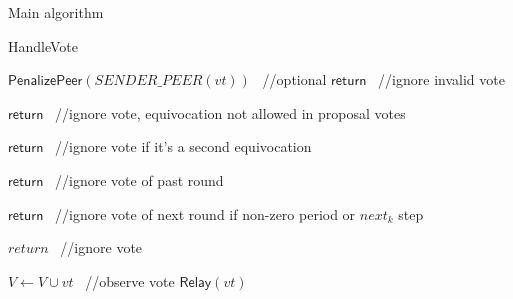 \documentclass[10pt,a4paper]{article}
\begin{document}
\begin{section}{Main algorithm}
\begin{subsection}{HandleVote}
\begin{algorithm}[H]
\begin{algorithmic}[1]
            


                \State $\mathsf{PenalizePeer}(SENDER\_PEER(vt))$ \ //optional
                \State $\mathsf{return}$ \ //ignore invalid vote
            \EndIf

                \State $\mathsf{return}$ \ //ignore vote, equivocation not allowed in proposal votes
            \EndIf

                \State $\mathsf{return}$ \ //ignore vote if it's a second equivocation
            \EndIf

                \State $\mathsf{return}$ \ //ignore vote of past round
            \EndIf

                \State $\mathsf{return}$ \ //ignore vote of next round if non-zero period or $next_k$ step
            \EndIf

                \State $return$ \ //ignore vote
            \EndIf

            \State $V \gets V \cup vt$ \ //observe vote
            \State $\mathsf{Relay}(vt)$


\end{algorithmic}
\end{algorithm}
\end{subsection}
\end{section}
\end{document}
